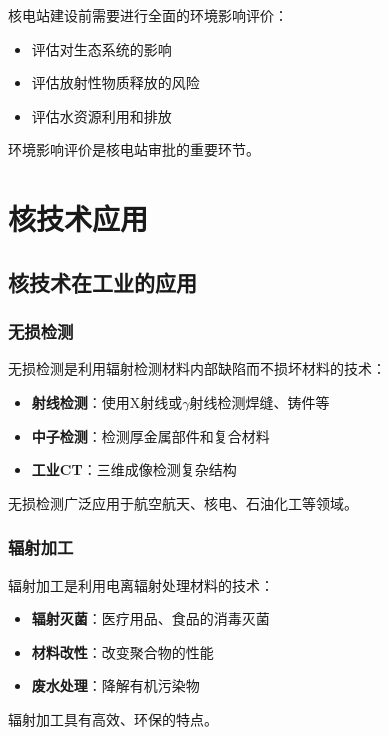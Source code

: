 \documentclass[12pt,UTF8]{ctexbook}
\begin{document}
核电站建设前需要进行全面的环境影响评价：

\begin{itemize}[leftmargin=2cm]
    \item 评估对生态系统的影响
    \item 评估放射性物质释放的风险
    \item 评估水资源利用和排放
\end{itemize}

环境影响评价是核电站审批的重要环节。

\part{核技术应用}

\chapter{核技术在工业的应用}

\section{无损检测}

无损检测是利用辐射检测材料内部缺陷而不损坏材料的技术：

\begin{itemize}[leftmargin=2cm]
    \item \textbf{射线检测}：使用X射线或$\gamma$射线检测焊缝、铸件等
    \item \textbf{中子检测}：检测厚金属部件和复合材料
    \item \textbf{工业CT}：三维成像检测复杂结构
\end{itemize}

无损检测广泛应用于航空航天、核电、石油化工等领域。

\section{辐射加工}

辐射加工是利用电离辐射处理材料的技术：

\begin{itemize}[leftmargin=2cm]
    \item \textbf{辐射灭菌}：医疗用品、食品的消毒灭菌
    \item \textbf{材料改性}：改变聚合物的性能
    \item \textbf{废水处理}：降解有机污染物
\end{itemize}

辐射加工具有高效、环保的特点。
\end{document}
